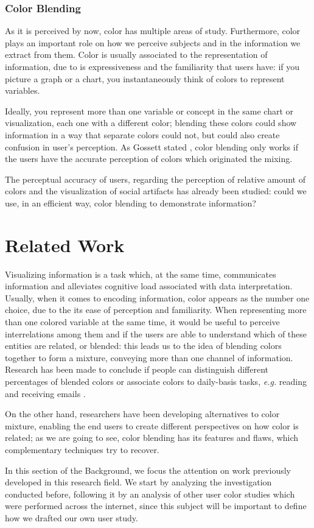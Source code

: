 \subsubsection{Color Blending}
%
As it is perceived by now, color has multiple areas of study. Furthermore, color plays an important role
on how we perceive subjects and in the information we extract from them. Color is usually associated to
the representation of information, due to is expressiveness and the familiarity that users have: if you
picture a graph or a chart, you instantaneously think of colors to represent variables. \par
Ideally, you represent more than one variable or concept in the same chart or visualization, each one
with a different color; blending these colors could show information in a way that separate colors could
not, but could also create confusion in user’s perception. As Gossett stated \cite{Gossett2004}, color blending only
works if the users have the accurate perception of colors which originated the mixing. \par
The perceptual accuracy of users, regarding the perception of relative amount of colors and the visualization
of social artifacts has already been studied: could we use, in an efficient way, color blending to demonstrate
information?
%
\section{Related Work}
\label{sec:related_work}
%
Visualizing information is a task which, at the same time, communicates information and alleviates
cognitive load associated with data interpretation. Usually, when it comes to encoding information, color
appears as the number one choice, due to the its ease of perception and familiarity. When representing
more than one colored variable at the same time, it would be useful to perceive interrelations among
them and if the users are able to understand which of these entities are related, or blended: this leads
us to the idea of blending colors together to form a mixture, conveying more than one channel of information.
Research has been made to conclude if people can distinguish different percentages of blended colors or
associate colors to daily-basis tasks, \emph{e.g.} reading and receiving emails \cite{Gama20143}. \par
On the other hand, researchers have been developing alternatives to color mixture, enabling the end users
to create different perspectives on how color is related; as we are going to see, color blending has its
features and flaws, which complementary techniques try to recover. \par
%
In this section of the Background, we focus the attention on work previously developed in this research field. We
start by analyzing the investigation conducted before, following it by an analysis of other user color studies
which were performed across the internet, since this subject will be important to define how we drafted our own
user study.
%
